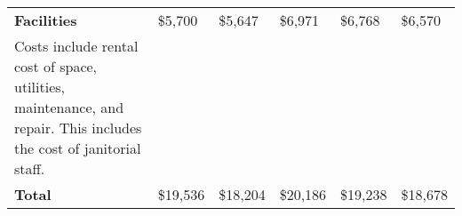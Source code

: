 \begin{tabular}{L{9.5cm} C{1cm} C{1cm} C{1cm} C{1cm} C{1cm}}
\textbf{Facilities} &  \$5,700 	 & 	 \$5,647 	 & 	 \$6,971 	 & 	 \$6,768 	 & 	 \$6,570 	 \\ 
\hspace{.2cm} Costs include rental cost of space, utilities, maintenance, and repair. This includes the cost of janitorial staff.&  \\

\textbf{Total}  & \$19,536 	 & 	 \$18,204 	 & 	 \$20,186 	 & 	 \$19,238 	 & 	 \$18,678 	 \\ 

\hline \hline
\end{tabular}